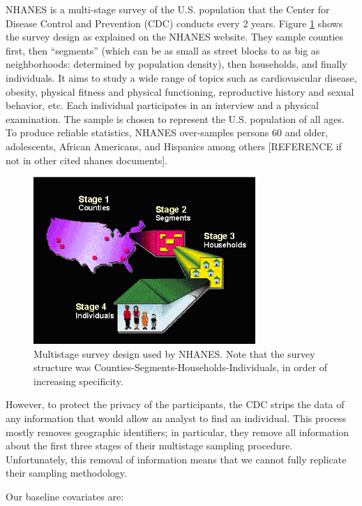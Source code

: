 \documentclass{article}
\begin{document}
NHANES is a multi-stage survey of the U.S. population that the Center for Disease Control and Prevention (CDC) conducts every 2 years. Figure \ref{fig:survey.design} shows the survey design as explained on the NHANES website.  They sample counties first, then ``segments'' (which can be as small as street blocks to as big as neighborhoods: determined by population density), then households, and finally individuals.  It aims to study a wide range of topics such as cardiovascular disease, obesity, physical fitness and physical functioning, reproductive history and sexual behavior, etc.  Each individual participates in an interview and a physical examination.  The sample is chosen to represent the U.S. population of all ages.  To produce reliable statistics, NHANES over-samples persons 60 and older, adolescents, African Americans, and Hispanics among others [REFERENCE if not in other cited nhanes documents].  

\begin{figure}
\centering
\includegraphics[width=0.75\textwidth]{figures/Survey_Design.PNG}
\caption{Multistage survey design used by NHANES. Note that the survey structure was Counties-Segments-Households-Individuals, in order of increasing specificity.}
\label{fig:survey.design}
\end{figure}

However, to protect the privacy of the participants, the CDC strips the data of any information that would allow an analyst to find an individual.  This process mostly removes geographic identifiers; in particular, they remove all information about the first three stages of their multistage sampling procedure.  Unfortunately, this removal of information means that we cannot fully replicate their sampling methodology.

Our baseline covariates are:
\vspace{0.5cm}
\end{document}
